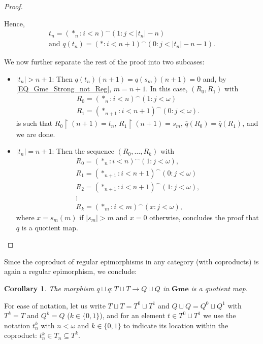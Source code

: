 \documentclass[12pt]{amsart}
\newtheorem{cor}[thm]{Corollary}
\theoremstyle{definition}
\newcommand{\seq}[1]{{\left( {#1} \right)}}
\DeclareMathOperator{\restrict}{\upharpoonright}
\newcommand{\Gmes}{\mathbf{Gme}}
\begin{document}
\begin{proof}
\begin{itemize}
		Hence, 
		\begin{gather*}
			t_n = \seq{\ast_n: i<n}^\smallfrown \seq{1:j<|t_n|-n}\\
			\text{and } q(t_n) = \seq{\ast: i<n+1}^\smallfrown \seq{0:j<|t_n|-n-1}.
		\end{gather*}
		
		We now further separate the rest of the proof into two subcases:
		
		\begin{itemize}
			\item $|t_n|>n+1$: Then $q(t_n)(n+1) =q(s_m)(n+1)= 0$ and, by \eqref{EQ_Gme_Strong_not_Reg}, $m=n+1$. In this case, $\seq{R_0,R_1}$ with
			\begin{gather*}
				R_0=\seq{\ast_n:i<n}^\smallfrown \seq{1:j<\omega}\\
				R_1 = \seq{\ast_{n+1}:i<n+1}^\smallfrown\seq{0:j<\omega}.
			\end{gather*} 
			is such that $R_0\restrict (n+1) = t_n$, $R_1\restrict (n+1) = s_m$,  $\overline{q}(R_0)=\overline{q}(R_1)$, and we are done.
			\item $|t_n|=n+1$: Then the sequence $\seq{R_0, \dotsc, R_k}$ with 
			\begin{gather*}
				R_0 = \seq{\ast_n: i<n}^\smallfrown\seq{1:j<\omega},\\
				R_1 = \seq{\ast_{n+1}: i<n+1}^\smallfrown\seq{0:j<\omega}\\
				R_2 = \seq{\ast_{n+1}: i<n+1}^\smallfrown\seq{1:j<\omega},\\
				\vdots\\
				R_k = \seq{\ast_{m}: i<m}^\smallfrown\seq{x:j<\omega},
			\end{gather*}
			where $x=s_m(m)$ if $|s_m|>m$ and $x=0$ otherwise, concludes the proof that $q$ is a quotient map.
		\end{itemize} 
	\end{itemize}
\end{proof}

Since the coproduct of regular epimorphisms in any category (with coproducts) is again a regular epimorphism, we conclude:

\begin{cor}\label{PROP_Gme_QotientCoprods}
	The morphism $q\sqcup q \colon T\sqcup T\to Q\sqcup Q$ in $\Gmes$ is a quotient map.	
\end{cor}

For ease of notation, let us write $T\sqcup T = T^0\sqcup T^1$ and $Q\sqcup Q = Q^0\sqcup Q^1$ with $T^k = T$ and $Q^k = Q$ ($k\in \{0,1\}$), and for an element $t\in T^0\sqcup T^1$ we use the notation $t_n^k$ with $n<\omega$ and $k\in \{0,1\}$ to indicate its location within the coproduct: $t_n^k\in T_n\subseteq T^k$.
\end{document}
